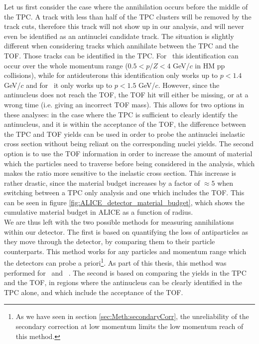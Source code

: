 Let us first consider the case where the annihilation occurs before the middle of the TPC. A track with less than half of the TPC clusters will be removed by the track cuts, therefore this track will not show up in our analysis, and will never even be identified as an antinuclei candidate track. The situation is slightly different when considering tracks which annihilate between the TPC and the TOF. Those tracks can be identified in the TPC. For \ahe\ this identification can occur over the whole momentum range ($0.5<p/Z<4$ GeV/$c$ in HM pp collisions), while for antideuterons this identification only works up to $p<1.4$ GeV/$c$ and for \atrit\ it only works up to $p<1.5$ GeV/$c$. However, since the antinucleus does not reach the TOF, the TOF hit will either be missing, or at a wrong time (i.e. giving an incorrect TOF mass). This allows for two options in these analyses: in the case where the TPC is sufficient to clearly identify the antinucleus, and it is within the acceptance of the TOF, the difference between the TPC and TOF yields can be used in order to probe the antinuclei inelastic cross section without being reliant on the corresponding nuclei yields. The second option is to use the TOF information in order to increase the amount of material which the particles need to traverse before being considered in the analysis, which makes the ratio more sensitive to the inelastic cross section. This increase is rather drastic, since the material budget increases by a factor of $\approx 5$ when switching between a TPC only analysis and one which includes the TOF. This can be seen in figure \ref{fig:ALICE_detector_material_budget}, which shows the cumulative material budget in ALICE as a function of radius. \\

We are thus left with the two possible methods for measuring annihilations within our detector. The first is based on quantifying the loss of antiparticles as they move through the detector, by comparing them to their particle counterparts. This method works for any particles and momentum range which the detectors can probe a priori\footnote{As we have seen in section \ref{sec:Meth:secondaryCorr}, the unreliability of the secondary correction at low momentum limits the low momentum reach of this method.}. As part of this thesis, this method was performed for \ahe\ and \atrit\ . The second is based on comparing the yields in the TPC and the TOF, in regions where the antinucleus can be clearly identified in the TPC alone, and which include the acceptance of the TOF. \\

